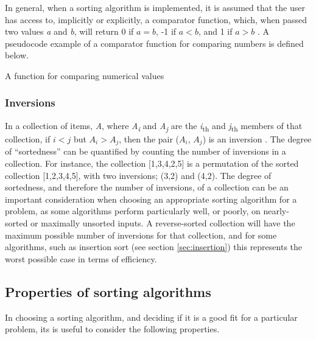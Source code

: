 \documentclass[12pt, a4paper]{article}
\begin{document}
In general, when a sorting algorithm is implemented, it is assumed that the user has access to, implicitly or explicitly, a comparator function, which, when passed two values \emph{a} and \emph{b}, will return 0 if $a = b$, -1 if $a < b$, and 1 if $a > b$ \autocite[55]{heineman2016algorithms}. A pseudocode example of a comparator function for comparing numbers is defined below.

\begin{algorithm}[H]
    \caption{A function for comparing numerical values}\label{comparator}
    \begin{algorithmic}[1]
     
    \EndIf
     
    \EndIf
     
    \EndIf
    \EndProcedure
    \end{algorithmic}
\end{algorithm}

\subsubsection{Inversions}

In a collection of items, \emph{A}, where \emph{A\textsubscript{i}} and \emph{A\textsubscript{j}} are the \emph{i}\textsubscript{th}  and \emph{j}\textsubscript{th} members of that collection, if $i < j$ but $A_{i} > A_{j}$, then the pair ($A_{i}$, $A_{j}$) is an inversion \autocite[11]{knuth1968art}. The degree of  ``sortedness'' can be quantified by counting the number of inversions in a collection. For instance, the collection [1,3,4,2,5] is a permutation of the sorted collection [1,2,3,4,5], with  two inversions; (3,2) and (4,2). The degree of sortedness, and therefore the number of inversions, of a collection can be an important consideration when choosing an appropriate sorting algorithm for a problem, as some algorithms perform particularly well, or poorly, on nearly-sorted or maximally unsorted inputs. A reverse-sorted collection will have the maximum possible number of inversions for that collection, and for some algorithms, such as insertion sort (see section \ref{sec:insertion}) this represents the worst possible case in terms of efficiency.


\subsection{Properties of sorting algorithms}

In choosing a sorting algorithm, and deciding if it is a good fit for a particular problem, its is useful to consider the following properties.
\end{document}
